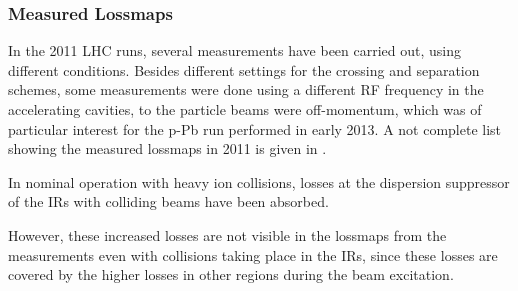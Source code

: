 \subsubsection{Measured Lossmaps}\label{140619}
In the 2011 LHC runs, several measurements have been carried out, using different conditions. Besides different settings for the crossing and separation schemes, some measurements were done using a different RF frequency in the accelerating cavities, to the particle beams were off-momentum, which was of particular interest for the p-Pb run performed in early 2013. A not complete list showing the measured lossmaps in 2011 is given in . 

In nominal operation with heavy ion collisions, losses at the dispersion suppressor of the IRs with colliding beams have been absorbed. 

However, these increased losses are not visible in the lossmaps from the measurements even with collisions taking place in the IRs, since these losses are covered by the higher losses in other regions during the beam excitation.

